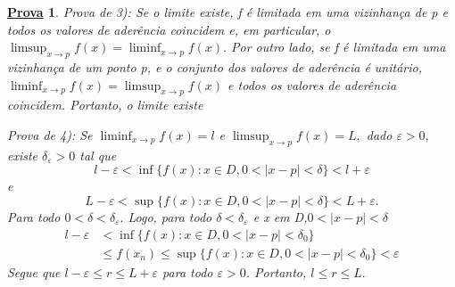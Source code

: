 \documentclass{article}
\newtheorem*{proof*}{\underline{Prova}}
\begin{document}
\begin{proof*}
  Prova de 3): Se o limite existe, f \'e limitada em uma vizinhan\c ca de p e todos os valores de ader\^encia coincidem e,
em particular, o $\limsup_{x\to p}f(x) = \liminf_{x\to p}f(x).$ Por outro lado, se f \'e limitada em uma vizinhan\c ca de um ponto p,
e o conjunto dos valores de ader\^encia \'e unit\'ario, $\liminf_{x\to p}f(x)=\limsup_{x\to p}f(x)$ e todos os valores de ader\^encia
coincidem. Portanto, o limite existe 
  
  Prova de 4): Se $\liminf_{x\to p}f(x) = l$ e $\limsup_{x\to p}f(x) = L,$ dado $\varepsilon > 0,$ existe $\delta_{\varepsilon}>0$
  tal que 
    $$
    l - \varepsilon < \inf{\{f(x):x\in D, 0<|x-p|<\delta\}} < l + \varepsilon
    $$
  e 
    $$
      L - \varepsilon < \sup{\{f(x):x\in D, 0<|x-p|<\delta\}} < L + \varepsilon.
    $$
  Para todo $0<\delta<\delta_{\varepsilon}.$  Logo, para todo $\delta<\delta_{\varepsilon}$ e x em D,$0<|x-p|<\delta$
 \begin{align*}
   l - \varepsilon &< \inf\{f(x):x\in D, 0 < |x-p| < \delta_{0}\}\\
   &\leq{}f(x_{n})\leq{}\sup\{f(x):x\in D, 0 <|x-p|<\delta_{0}\} < \varepsilon
 \end{align*}
 Segue que $l-\varepsilon\leq{r}\leq{L+\varepsilon}$ para todo $\varepsilon > 0$. Portanto, $l\leq{r}\leq{L}.$
\end{proof*}
\end{document}
